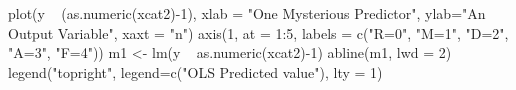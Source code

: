 \begin{Schunk}
\begin{Sinput}
 plot(y ~ (as.numeric(xcat2)-1), xlab = "One Mysterious Predictor", ylab="An Output Variable", xaxt = "n")
 axis(1, at = 1:5, labels = c("R=0", "M=1", "D=2", "A=3", "F=4"))
 m1 <- lm(y ~ as.numeric(xcat2)-1)
 abline(m1, lwd = 2)
 legend("topright", legend=c("OLS Predicted value"), lty = 1)
\end{Sinput}
\end{Schunk}
